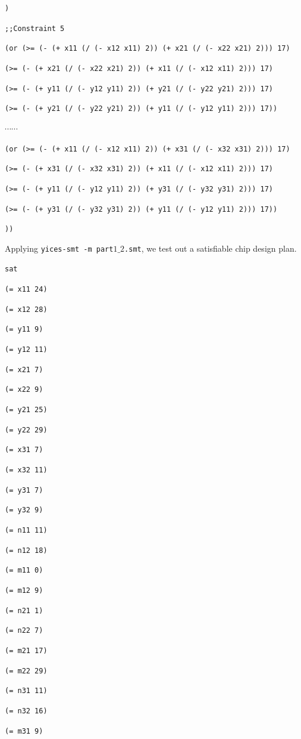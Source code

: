 \documentclass[11pt]{article}
\begin{document}
{{{{\tt )}

{\tt ;;Constraint 5}

{\tt (or (>= (- (+ x11 (/ (- x12 x11) 2)) (+ x21 (/ (- x22 x21) 2))) 17)}

{\tt (>= (- (+ x21 (/ (- x22 x21) 2)) (+ x11 (/ (- x12 x11) 2))) 17)}

{\tt (>= (- (+ y11 (/ (- y12 y11) 2)) (+ y21 (/ (- y22 y21) 2))) 17)}

{\tt (>= (- (+ y21 (/ (- y22 y21) 2)) (+ y11 (/ (- y12 y11) 2))) 17))}

$\cdots \cdots$

{\tt (or (>= (- (+ x11 (/ (- x12 x11) 2)) (+ x31 (/ (- x32 x31) 2))) 17)}

{\tt (>= (- (+ x31 (/ (- x32 x31) 2)) (+ x11 (/ (- x12 x11) 2))) 17)}

{\tt (>= (- (+ y11 (/ (- y12 y11) 2)) (+ y31 (/ (- y32 y31) 2))) 17)}

{\tt (>= (- (+ y31 (/ (- y32 y31) 2)) (+ y11 (/ (- y12 y11) 2))) 17))}

{\tt ))}
}

Applying {\tt yices-smt -m part$1\_2$.smt}, we test out a satisfiable chip design plan.

{\footnotesize

{\tt sat}

{\tt(= x11 24)}

{\tt(= x12 28)}

{\tt(= y11 9)}

{\tt(= y12 11)}

{\tt(= x21 7)}

{\tt(= x22 9)}

{\tt(= y21 25)}

{\tt(= y22 29)}

{\tt(= x31 7)}

{\tt(= x32 11)}

{\tt(= y31 7)}

{\tt(= y32 9)}

{\tt(= n11 11)}

{\tt(= n12 18)}

{\tt(= m11 0)}

{\tt(= m12 9)}

{\tt(= n21 1)}

{\tt(= n22 7)}

{\tt(= m21 17)}

{\tt(= m22 29)}

{\tt(= n31 11)}

{\tt(= n32 16)}

{\tt(= m31 9)}

}}}
\end{document}
